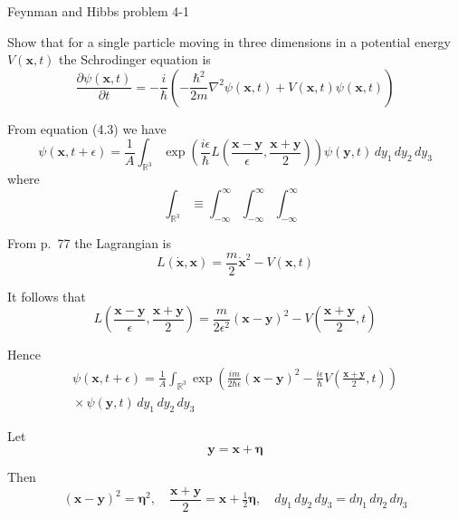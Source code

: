 \documentclass[12pt]{article}
\begin{document}
\begin{center}
Feynman and Hibbs problem 4-1
\end{center}

Show that for a single particle moving in three dimensions
in a potential energy $V(\mathbf x,t)$ the Schrodinger equation is
\begin{equation*}
\frac{\partial\psi(\mathbf x,t)}{\partial t}
=-\frac{i}{\hbar}\left(
-\frac{\hbar^2}{2m}\nabla^2\psi(\mathbf x,t)+V(\mathbf x,t)\psi(\mathbf x,t)\right)
\end{equation*}

\bigskip
From equation (4.3) we have
\begin{equation*}
\psi(\mathbf{x},t+\epsilon)
=\frac{1}{A}\int_{\mathbb R^3}
\exp\left(
\frac{i\epsilon}{\hbar}L
\left(\frac{\mathbf{x}-\mathbf{y}}{\epsilon},\frac{\mathbf{x}+\mathbf{y}}{2}\right)
\right)\psi(\mathbf{y},t)\,dy_1\,dy_2\,dy_3
\tag{1}
\end{equation*}
where
\begin{equation*}
\int_{\mathbb R^3}
\equiv\int_{-\infty}^\infty\int_{-\infty}^\infty\int_{-\infty}^\infty
\end{equation*}

From p.~77 the Lagrangian is
\begin{equation*}
L(\dot{\mathbf x},\mathbf x)=\frac{m}{2}\dot{\mathbf x}^2-V(\mathbf{x},t)
\end{equation*}

It follows that
\begin{equation*}
L\left(\frac{\mathbf{x}-\mathbf{y}}{\epsilon},\frac{\mathbf{x}+\mathbf{y}}{2}\right)
=\frac{m}{2\epsilon^2}(\mathbf{x}-\mathbf{y})^2
-V\left(\frac{\mathbf{x}+\mathbf{y}}{2},t\right)
\end{equation*}

Hence
\begin{multline*}
\psi(\mathbf{x},t+\epsilon)=
\frac{1}{A}\int_{\mathbb R^3}
\exp\left(
\frac{im}{2\hbar\epsilon}(\mathbf{x}-\mathbf{y})^2
-\frac{i\epsilon}{\hbar}V\left(\frac{\mathbf{x}+\mathbf{y}}{2},t\right)
\right)
\\
{}\times\psi(\mathbf{y},t)
\,dy_1\,dy_2\,dy_3
\end{multline*}

Let
\begin{equation*}
\mathbf y=\mathbf x+\boldsymbol\eta
\end{equation*}

Then
\begin{equation*}
(\mathbf x-\mathbf y)^2=\boldsymbol\eta^2,\quad
\frac{\mathbf x+\mathbf y}{2}=\mathbf{x}+\tfrac{1}{2}\boldsymbol\eta,\quad
dy_1\,dy_2\,dy_3=d\eta_1\,d\eta_2\,d\eta_3
\end{equation*}
\end{document}
